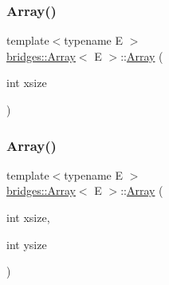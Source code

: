 \mbox{\label{classbridges_1_1_array_a0a475058b73b938f0fd3f577365aca89}} 
\subsubsection{\texorpdfstring{Array()}{Array()}\hspace{0.1cm}{\footnotesize\ttfamily [3/5]}}
{\footnotesize\ttfamily template$<$typename E $>$ \\
\mbox{\hyperlink{classbridges_1_1_array}{bridges\+::\+Array}}$<$ E $>$\+::\mbox{\hyperlink{classbridges_1_1_array}{Array}} (\begin{DoxyParamCaption}\item[{int}]{xsize }\end{DoxyParamCaption})\hspace{0.3cm}{\ttfamily [inline]}}

\mbox{\label{classbridges_1_1_array_a13b26fc4d2ccb19b277b2acc615efce2}} 
\subsubsection{\texorpdfstring{Array()}{Array()}\hspace{0.1cm}{\footnotesize\ttfamily [4/5]}}
{\footnotesize\ttfamily template$<$typename E $>$ \\
\mbox{\hyperlink{classbridges_1_1_array}{bridges\+::\+Array}}$<$ E $>$\+::\mbox{\hyperlink{classbridges_1_1_array}{Array}} (\begin{DoxyParamCaption}\item[{int}]{xsize,  }\item[{int}]{ysize }\end{DoxyParamCaption})\hspace{0.3cm}{\ttfamily [inline]}}

\mbox{\label{classbridges_1_1_array_a3504e71cacffd343edf8b9ea16f75eb4}} 
